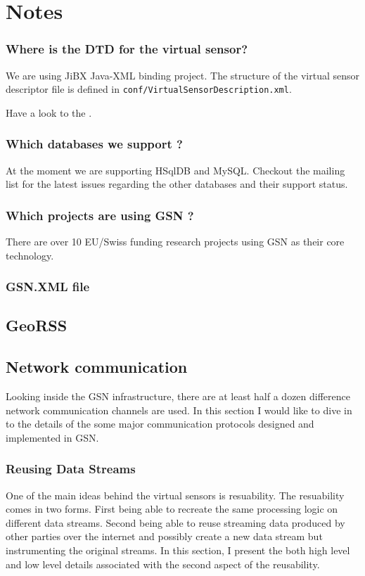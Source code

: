 \section{Notes}


\subsubsection{Where is the DTD for the virtual sensor?}
We are using JiBX Java-XML binding project. The structure of the virtual sensor descriptor file is defined in \texttt{conf/VirtualSensorDescription.xml}.

Have a look to the .

\subsubsection{Which databases we support ?}
At the moment we are supporting HSqlDB and MySQL. Checkout the mailing list for the latest issues regarding the other databases and their
support status.
\subsubsection{Which projects are using GSN ?}
There are over 10 EU/Swiss funding research projects using GSN as their core technology.
\subsubsection{GSN.XML file}
\subsection{GeoRSS}
\subsection{Network communication}
Looking inside the GSN infrastructure, there are at least half a dozen difference network communication channels are used. In this section I would like to dive in to the details
of the some major communication protocols designed and implemented in GSN. 

\subsubsection{Reusing Data Streams}

One of the main ideas behind the virtual sensors is resuability. The resuability comes in two forms.
First being able to recreate the same processing logic on different data streams.
Second being able to reuse streaming data produced by other parties over the internet and possibly create a new data stream but instrumenting the original streams.
In this section, I present the both high level and low level details associated with the second aspect of the reusability.


